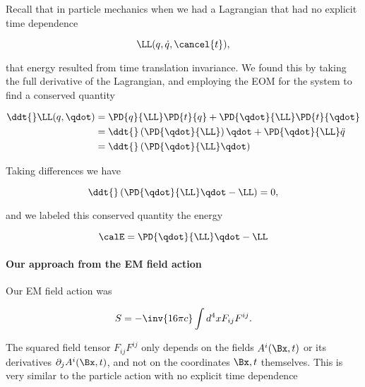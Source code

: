 Recall that in particle mechanics when we had a Lagrangian that had no explicit time dependence

\begin{equation}\label{eqn:relativisticElectrodynamicsL21b:380}
\LL(q, \dot{q}, \cancel{t}),
\end{equation}

that energy resulted from time translation invariance.  We found this by taking the full derivative of the Lagrangian, and employing the EOM for the system to find a conserved quantity

\begin{equation}\label{eqn:relativisticElectrodynamicsL21b:560}
\begin{aligned}
\ddt{} \LL(q, \qdot) 
&=
\PD{q}{\LL} \PD{t}{q}
+\PD{\qdot}{\LL} \PD{t}{\qdot} \\
&=
\ddt{} \left( \PD{\qdot}{\LL} \right) \qdot
+\PD{\qdot}{\LL} \ddot{q} \\
&=
\ddt{} \left( \PD{\qdot}{\LL} \qdot \right) 
\end{aligned}
\end{equation}

Taking differences we have

\begin{equation}\label{eqn:relativisticElectrodynamicsL21b:400}
\ddt{} \left( \PD{\qdot}{\LL} \qdot -\LL \right) = 0,
\end{equation}

and we labeled this conserved quantity the energy

\begin{equation}\label{eqn:relativisticElectrodynamicsL21b:420}
\calE = \PD{\qdot}{\LL} \qdot -\LL 
\end{equation}

\paragraph{Our approach from the EM field action}

Our EM field action was

\begin{equation}\label{eqn:relativisticElectrodynamicsL21b:500}
S = -\inv{16 \pi c} \int d^4 x F_{i j} F^{i j}.
\end{equation}

The squared field tensor \(F_{i j} F^{i j}\) only depends on the fields \(A^i(\Bx, t)\) or its derivatives \(\partial_j A^i(\Bx, t)\), and not on the coordinates \(\Bx, t\) themselves.  This is very similar to the particle action with no explicit time dependence

